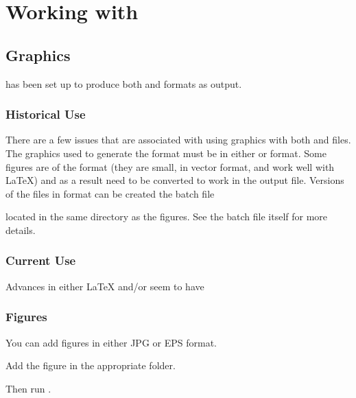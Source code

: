 \chapter{Working with \lelatex}

\section{Graphics}
\lelatex{} has been set up to produce both  and  formats as output.

\subsection{Historical Use}
There are a few issues that are associated with using graphics with both  and  files.  The graphics used to generate the  format must be in either  or  format.  Some figures are of the  format (they are small, in vector format, and work well with \LaTeX) and as a result need to be converted to work in the  output file.  Versions of the  files in  format can be created the batch file
\begin{plainlist}
	\item {}
\end{plainlist}
located in the same directory as the figures.  See the batch file itself for more details.

\subsection{Current Use}
Advances in either \LaTeX{} and/or \miktex{} seem to have

\subsection{Figures}
You can add figures in either JPG or EPS format.
\begin{numberedlist}
	\item Add the figure in the appropriate folder.
	\begin{plainlist}
		\item {}
		\item {}
	\end{plainlist}
	\item Then run .
\end{numberedlist}


